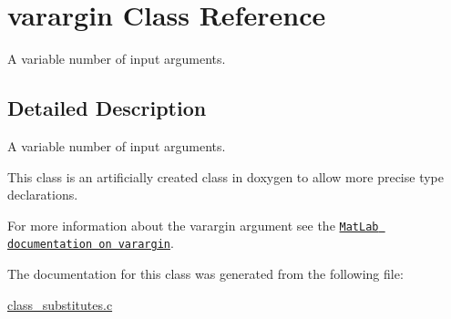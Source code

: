 \hypertarget{a00014}{\section{varargin Class Reference}
\label{a00014}
}


A variable number of input arguments.  




\subsection{Detailed Description}
A variable number of input arguments. 

This class is an artificially created class in doxygen to allow more precise type declarations.

For more information about the varargin argument see the \href{http://www.mathworks.de/help/techdoc/ref/varargin.html}{\tt Mat\-Lab documentation on varargin}. 

The documentation for this class was generated from the following file\-:\begin{DoxyCompactItemize}
\item 
\hyperlink{a00016}{class\-\_\-substitutes.\-c}\end{DoxyCompactItemize}
